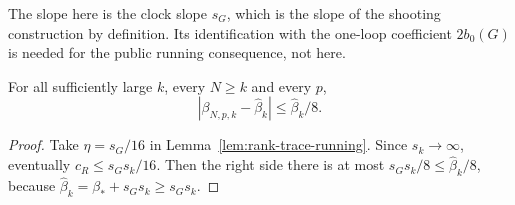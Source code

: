 The slope here is the clock slope $s_G$, which is the slope of the
shooting construction by definition. Its identification with the one-loop
coefficient $2b_0(G)$ is needed for the public running consequence, not
here.

\begin{lemma}
\label{lem:rank-trace-endpoint}
For all sufficiently large $k$, every $N\ge k$ and every $p$,
\[
 |\beta_{N,p,k}-\widehat\beta_k|\le\widehat\beta_k/8 .
\]
\end{lemma}
\begin{proof}
Take $\eta=s_G/16$ in Lemma~\ref{lem:rank-trace-running}. Since
$s_k\to\infty$, eventually $c_R\le s_Gs_k/16$. Then the right side there
is at most $s_Gs_k/8\le\widehat\beta_k/8$, because
$\widehat\beta_k=\beta_*+s_Gs_k\ge s_Gs_k$.
\end{proof}

